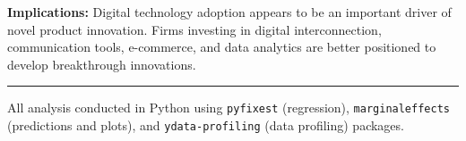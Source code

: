 \documentclass[a4paper,12pt]{article}
\begin{document}
\textbf{Implications:} Digital technology adoption appears to be an important driver of novel product innovation. Firms investing in digital interconnection, communication tools, e-commerce, and data analytics are better positioned to develop breakthrough innovations.

\vspace{1cm}
\hrule
\vspace{0.5cm}
\small
All analysis conducted in Python using \texttt{pyfixest} (regression), \texttt{marginaleffects} (predictions and plots), and \texttt{ydata-profiling} (data profiling) packages.
\end{document}
